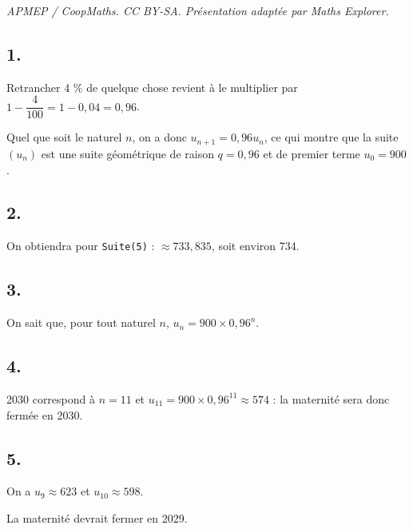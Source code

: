 \documentclass[10pt]{article}
\begin{document}
\noindent\textit{APMEP / CoopMaths. CC BY-SA. Présentation adaptée par Maths Explorer.}\par\medskip
\subsection*{1.}

Retrancher 4 \% de quelque chose revient à le multiplier par \(1 - \dfrac{4}{100} = 1 - 0{,}04 = 0{,}96\).

Quel que soit le naturel \(n\), on a donc \(u_{n+1} = 0{,}96u_n\), ce qui montre que la suite \((u_n)\) est une suite géométrique de raison \(q = 0{,}96\) et de premier terme \(u_0 = 900\).

\subsection*{2.}

On obtiendra pour \texttt{Suite(5)} : \( \approx 733{,}835 \), soit environ 734.

\subsection*{3.}

On sait que, pour tout naturel \(n\), \(u_n = 900 \times 0{,}96^n\).

\subsection*{4.}

2030 correspond à \(n = 11\) et \(u_{11} = 900 \times 0{,}96^{11} \approx 574\) : la maternité sera donc fermée en 2030.

\subsection*{5.}

On a \(u_9 \approx 623\) et \(u_{10} \approx 598\).

La maternité devrait fermer en 2029.
\end{document}
